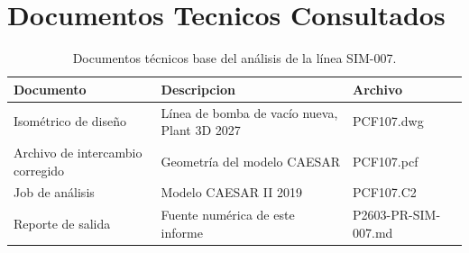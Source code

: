 \appendix
\section{Documentos Tecnicos Consultados}
\label{appendix:documentos}

\begin{table}[htbp]
    \centering
    \small
    \caption{Documentos t\'{e}cnicos base del an\'{a}lisis de la l\'{i}nea SIM-007.}
    \label{tab:planos}
    \begin{tabular}{@{}lll@{}}
        \toprule
        \textbf{Documento} & \textbf{Descripcion} & \textbf{Archivo} \\
        \midrule
        Isom\'{e}trico de dise\~{n}o & L\'{i}nea de bomba de vac\'{i}o nueva, Plant 3D 2027 & PCF107.dwg \\
        Archivo de intercambio corregido & Geometr\'{i}a del modelo CAESAR & PCF107.pcf \\
        Job de an\'{a}lisis & Modelo CAESAR II 2019 & PCF107.C2 \\
        Reporte de salida & Fuente num\'{e}rica de este informe & P2603-PR-SIM-007.md \\
        \bottomrule
    \end{tabular}
\end{table}
